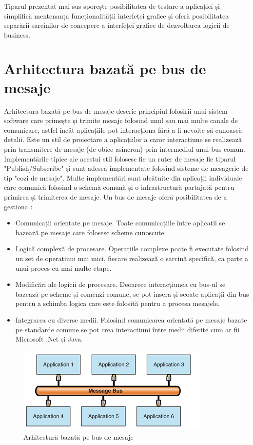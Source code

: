 \documentclass[12pt, a4paper, oneside, romanian]{teza-upb}
\begin{document}
Tiparul prezentat mai sus sporește posibilitatea de testare a aplicației și simplifică mentenanța funcționalității interfeței grafice și oferă posibilitatea separării sarcinilor de concepere a interfeței grafice de dezvoltarea logicii de business.

\section{Arhitectura bazată pe bus de mesaje}
Arhitectura bazată pe bus de mesaje descrie principiul folosirii unui sistem software care primește și trimite mesaje folosind unul sau mai multe canale de comunicare, astfel încât aplicațiile pot interacționa fără a fi nevoite să cunoască detalii. Este un stil de proiectare a aplicațiilor a caror interacțiune se realizează prin transmitere de mesaje (de obice asincron) prin intermediul unui bus comun. Implementările tipice ale acestui stil folosesc fie un ruter de mesaje fie tiparul "Publish/Subscribe" și sunt adesea implementate folosind sisteme de mesagerie de tip "cozi de mesaje". Multe implementări sunt alcătuite din aplicații individuale care comunică folosind o schemă comună și o infrastructură partajată pentru primirea și trimiterea de mesaje. Un bus de mesaje oferă posibilitatea de a gestiona :
\begin{itemize}
	\item Comunicații orientate pe mesaje.  Toate comunicațiile între aplicații se bazează pe mesaje care folosesc scheme cunoscute.
	\item Logică complexă de procesare. Operațiile complexe poate fi executate folosind un set de operațiuni mai mici, fiecare realizează o sarcină specifică, ca parte a unui proces cu mai multe etape.
	\item Modificări ale logicii de procesare. Deoarece interacțiunea cu bus-ul se bazează pe scheme și comenzi comune, se pot insera și scoate aplicații din bus pentru a schimba logica care este folosită pentru a procesa mesajele.
	\item Integrarea cu diverse medii. Folosind comunicarea orientată pe mesaje bazate pe standarde comune se pot crea interacțiuni între medii diferite cum ar fii Microsoft .Net și Java.
\end{itemize}

\begin{figure}[ht]
\centering
\includegraphics[scale=0.9]{img/message-bus.png}
\caption{Arhitectură bazată pe bus de mesaje}
\label{fig:arhi_bus_mesaje}
\end{figure}
\end{document}
